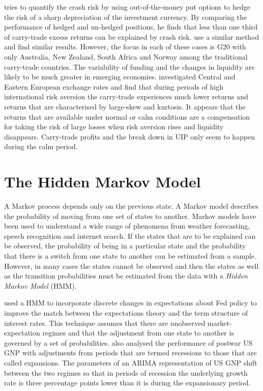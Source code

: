 \documentclass[12pt, a4paper, oneside]{article}\usepackage[]{graphicx}\usepackage[]{color}
\begin{document}
\citet{Jurek2} tries to quantify the crash risk by using out-of-the-money put options to hedge the risk of a sharp depreciation of the investment currency.  By comparing the performance of hedged and un-hedged positions, he finds that less than one third of carry-trade excess returns can be explained by crash risk.   \citet{Burnside2010} use a similar method and find similar results.  However, the focus in each of these cases is G20 with only Australia, New Zealand, South Africa and Norway among the traditional carry-trade countries.  The variability of funding and the changes in liquidity are likely to be much greater in emerging economies. \citet{Hayward2014} investigated Central and Eastern European exchange rates and find that during periods of high international risk aversion the carry-trade experiences much lower returns and returns that are characterised by large-skew and kurtosis.  It appears that the returns that are available under normal or calm conditions are a compensation for taking the risk of large losses when risk aversion rises and liquidity disappears. Carry-trade profits and the break down in UIP only seem to happen during the calm period. 

\section{The Hidden Markov Model}\label{secref:HMM}
  A Markov process depends only on the previous state.  A Markov model describes the probability of moving from one set of states to another.  Markov models have been used to understand a wide range of phenomena from weather forecasting, speech recognition and internet search.  If the states that are to be explained can be observed, the probability of being in a particular state and the probability that there is a switch from one state to another can be estimated from a sample.  However, in many cases the states cannot be observed and then the states as well as the transition probabilities must be estimated from the data with a \emph{Hidden Markov Model} (HMM).   

\citet{hamilton1988rational} used a HMM to incorporate discrete changes in expectations about Fed policy to improve the match between the expectations theory and the term structure of interest rates.  This technique assumes that there are unobserved market-expectation regimes and that the adjustment from one state to another is governed by a set of probabilities.  \citet{Hamilton1989} also analysed the performance of postwar US GNP with adjustments from periods that are termed recessions to those that are called expansions. The parameters of an ARIMA representation of US GNP shift between the two regimes so that in periods of recession the underlying growth rate is three percentage points lower than it is during the expansionary period.   
\end{document}
